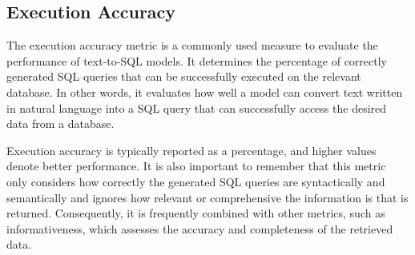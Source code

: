 \subsection{Execution Accuracy}

The execution accuracy metric\cite{yu_spider_2019} is a commonly used measure to evaluate the performance of text-to-SQL models. It determines the percentage of correctly generated SQL queries that can be successfully executed on the relevant database. In other words, it evaluates how well a model can convert text written in natural language into a SQL query that can successfully access the desired data from a database.

Execution accuracy is typically reported as a percentage, and higher values denote better performance. It is also important to remember that this metric only considers how correctly the generated SQL queries are syntactically and semantically and ignores how relevant or comprehensive the information is that is returned. Consequently, it is frequently combined with other metrics, such as informativeness, which assesses the accuracy and completeness of the retrieved data.
